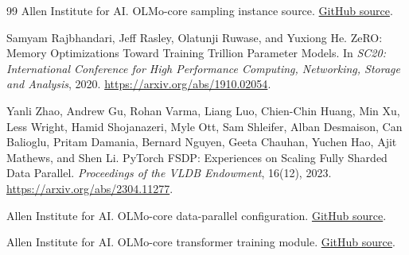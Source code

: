 \documentclass[11pt]{article}
\begin{document}
\begin{thebibliography}{99}
Allen Institute for AI.
\newblock OLMo-core sampling instance source.
\newblock \href{https://github.com/allenai/OLMo-core/blob/92870a33c3fee060d57c3faec52b0b369ece85a6/src/olmo_core/data/composable/sampling_instance_source.py}{GitHub source}.

Samyam Rajbhandari, Jeff Rasley, Olatunji Ruwase, and Yuxiong He.
\newblock ZeRO: Memory Optimizations Toward Training Trillion Parameter
Models.
\newblock In \emph{SC20: International Conference for High Performance
Computing, Networking, Storage and Analysis}, 2020.
\newblock \url{https://arxiv.org/abs/1910.02054}.

Yanli Zhao, Andrew Gu, Rohan Varma, Liang Luo, Chien-Chin Huang, Min Xu,
Less Wright, Hamid Shojanazeri, Myle Ott, Sam Shleifer, Alban Desmaison,
Can Balioglu, Pritam Damania, Bernard Nguyen, Geeta Chauhan, Yuchen Hao,
Ajit Mathews, and Shen Li.
\newblock PyTorch FSDP: Experiences on Scaling Fully Sharded Data Parallel.
\newblock \emph{Proceedings of the VLDB Endowment}, 16(12), 2023.
\newblock \url{https://arxiv.org/abs/2304.11277}.

Allen Institute for AI.
\newblock OLMo-core data-parallel configuration.
\newblock \href{https://github.com/allenai/OLMo-core/blob/92870a33c3fee060d57c3faec52b0b369ece85a6/src/olmo_core/distributed/parallel/data_parallel.py}{GitHub source}.

Allen Institute for AI.
\newblock OLMo-core transformer training module.
\newblock \href{https://github.com/allenai/OLMo-core/blob/92870a33c3fee060d57c3faec52b0b369ece85a6/src/olmo_core/train/train_module/transformer/train_module.py}{GitHub source}.

\end{thebibliography}
\end{document}
